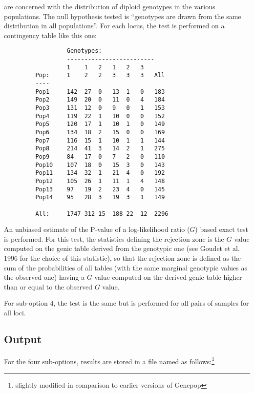 \documentclass[12pt,]{book}
\let\rmarkdownfootnote\footnote%
\def\footnote{\protect\rmarkdownfootnote}
\begin{document}
 are concerned with the distribution of
diploid genotypes in the various populations. The null hypothesis tested
is ``genotypes are drawn from the same distribution in all
populations''. For each locus, the test is performed on a contingency
table like this one:

\begin{verbatim}
                  Genotypes:
                  -------------------------
                  1    1   2   1   2   3
         Pop:     1    2   2   3   3   3   All
         ----
         Pop1     142  27  0   13  1   0   183
         Pop2     149  20  0   11  0   4   184
         Pop3     131  12  0   9   0   1   153
         Pop4     119  22  1   10  0   0   152
         Pop5     120  17  1   10  1   0   149
         Pop6     134  18  2   15  0   0   169
         Pop7     116  15  1   10  1   1   144
         Pop8     214  41  3   14  2   1   275
         Pop9     84   17  0   7   2   0   110
         Pop10    107  18  0   15  3   0   143
         Pop11    134  32  1   21  4   0   192
         Pop12    105  26  1   11  1   4   148
         Pop13    97   19  2   23  4   0   145
         Pop14    95   28  3   19  3   1   149

         All:     1747 312 15  188 22  12  2296
\end{verbatim}

An unbiased estimate of the P-value of a log-likelihood ratio (\(G\))
based exact test is performed. For this test, the statistics defining
the rejection zone is the \(G\) value computed on the genic table
derived from the genotypic one (see Goudet et al. 1996 for the choice of
this statistic), so that the
rejection zone is defined as the sum of the probabilities of all tables
(with the same marginal genotypic values as the observed one) having a
\(G\) value computed on the derived genic table higher than or equal to
the observed \(G\) value.

For sub-option 4, the test is the same but is performed for all pairs of
samples for all loci.

\subsection{Output}\label{output-2}

For the four sub-options, results are stored in a file named as
follows:\footnote{slightly modified in comparison to earlier versions of
  Genepop}
\end{document}
